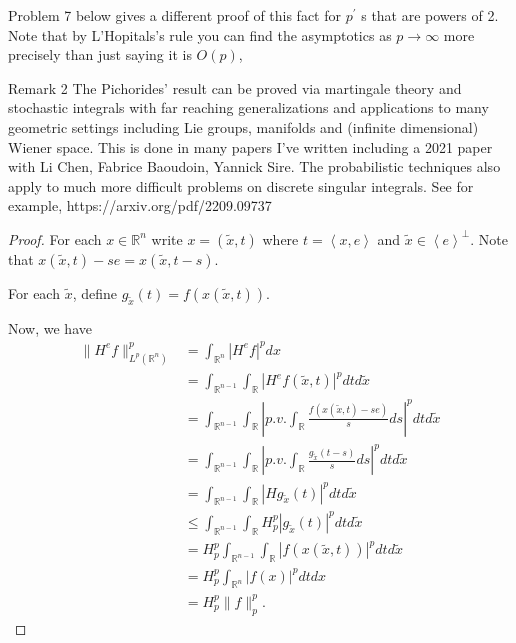 \begin{enumerate}
Problem 7 below gives a different proof of this fact for $p^{\prime}$ s that are powers of 2. Note that by L'Hopitals's rule you can find the asymptotics as $p \rightarrow \infty$ more precisely than just saying it is $O(p)$,

Remark 2 The Pichorides' result can be proved via martingale theory and stochastic integrals with far reaching generalizations and applications to many geometric settings including Lie groups, manifolds and (infinite dimensional) Wiener space. This is done in many papers I've written including a 2021 paper with Li Chen, Fabrice Baoudoin, Yannick Sire. The probabilistic techniques also apply to much more difficult problems on discrete singular integrals. See for example, https://arxiv.org/pdf/2209.09737

\begin{proof}
	For each $x \in \mathbb{R}^n$ write $x = (\tilde x, t)$ where $t = \left\langle x, e \right\rangle $ and $\tilde x \in \left\langle e \right\rangle ^{\perp}$. Note that $x(\tilde x, t) - s e = x(\tilde x, t - s)$. 

	For each $\tilde x$, define $g_{\tilde x}(t) = f\left( x(\tilde x, t) \right) $.

	Now, we have
	\begin{align*}
		\|H^e f\|_{L^p(\mathbb{R}^n)}^p
		&= \int _{\mathbb{R}^n} \left| H^e f \right| ^p dx \\
		&= \int _{\mathbb{R}^{n - 1}} \int _{\mathbb{R}} \left| H^e f(\tilde x, t)\right|^p dt d\tilde x   \\
		&= \int _{\mathbb{R}^{n - 1}} \int _{\mathbb{R}} \left| p.v. \int _{\mathbb{R}} \frac{f(x(\tilde x, t) - s e)}{s} d s\right|^p dt d\tilde x   \\
		&= \int _{\mathbb{R}^{n - 1}} \int _{\mathbb{R}} \left| p.v. \int _{\mathbb{R}} \frac{g_{\tilde x}(t - s)}{s} d s\right|^p dt d\tilde x   \\
		&= \int _{\mathbb{R}^{n - 1}} \int _{\mathbb{R}} \left| H g_{\tilde x} (t)\right|^p dt d\tilde x   \\
		&\leq \int _{\mathbb{R}^{n - 1}} \int _{\mathbb{R}} H_p^p\left| g_{\tilde x} (t)\right|^p dt d\tilde x   \\
		&= H_p^p \int _{\mathbb{R}^{n - 1}} \int _{\mathbb{R}}\left| f(x(\tilde x, t))\right|^p dt d\tilde x   \\
		&= H_p^p \int _{\mathbb{R}^{n}} \left| f(x)\right|^p dt d x   \\
		&= H_p^p \|f\|_p^p
	.\end{align*}
\end{proof}


\end{enumerate}

